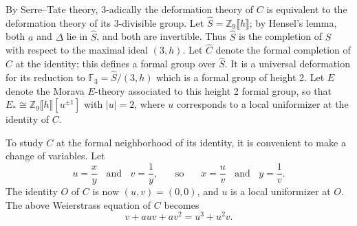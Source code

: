 \documentclass{gtpart}
\theoremstyle{definition}
\theoremstyle{remark}
\newcommand{\mb}[1]{\mathbb{#1}}
\newcommand{\BF}{{\mb F}}
\newcommand{\BZ}{{\mb Z}}
\newcommand{\HC}{\widehat{C}}
\newcommand{\HS}{\widehat{S}}
\begin{document}
By Serre--Tate theory, 3-adically the deformation theory of $C$ is equivalent to the deformation theory of its 3-divisible group.  
Let $\HS = \BZ_9 \llbracket h \rrbracket$; by Hensel's lemma, both $a$ and $\Delta$ lie in $\HS$, and both are invertible.  
Thus $\HS$ is the completion of $S$ with respect to the maximal ideal $(3,h)$.  
Let $\HC$ denote the formal completion of $C$ at the identity; this defines a formal group over $\HS$.  
It is a universal deformation for its reduction to $\BF_3 = \HS / (3,h)$ which is a formal group of height 2.  
Let $E$ denote the Morava $E$-theory associated to this height 2 formal group, 
so that $E_* \cong \BZ_9 \llbracket h \rrbracket [u^{\pm 1}]$ with $|u| = 2$, 
where $u$ corresponds to a local uniformizer at the identity of $C$.  

To study $C$ at the formal neighborhood of its identity, it is convenient to make a change of variables.  
Let 
\[
 u = \frac{x}{y}~~~~\text{and}~~~~v = \frac{1}{y},~~~~~~~~\text{so}~~~~~~~~x = \frac{u}{v}~~~~\text{and}~~~~y = \frac{1}{v}.  
\]
The identity $O$ of $C$ is now $(u,v) = (0,0)$, and $u$ is a local uniformizer at $O$.  
The above Weierstrass equation of $C$ becomes 
\begin{equation}
\label{nf}
 v + a u v + a v^2 = u^3 + u^2 v.  
\end{equation}
\end{document}
